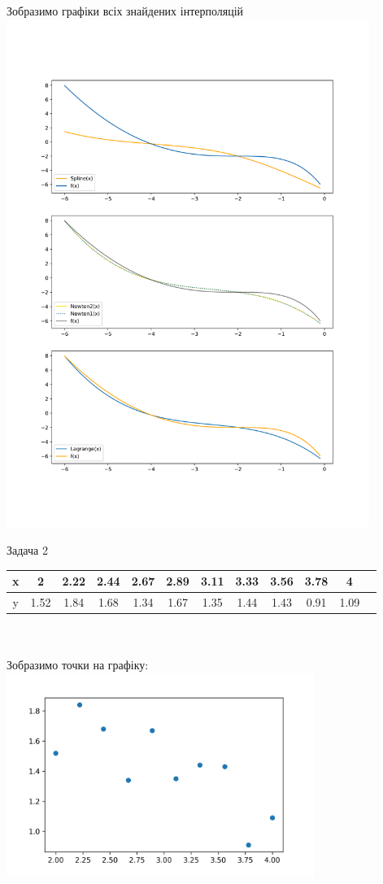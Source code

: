 \documentclass[14 pt]{extarticle}
\begin{document}
Зобразимо графіки всіх знайдених інтерполяцій \\ 
\includegraphics[width = 11.8cm]{plots.png}
\begin{center}
    \Large
    Задача 2
\end{center}
\begin{tabular}{|c|c|c|c|c|c|c|c|c|c|c|c|} \hline
    x &2&2.22&2.44&2.67&2.89&3.11&3.33&3.56&3.78&4 \\ \hline
    y &1.52&1.84&1.68&1.34&1.67&1.35&1.44&1.43&0.91&1.09 \\ \hline
\end{tabular}\\ \\
Зобразимо точки на графіку: \\ 
\includegraphics[width=10cm]{scatter.png} \\ 
\end{document}
